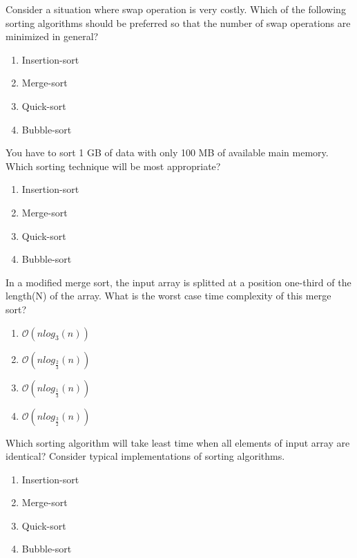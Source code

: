 \begin{problem}
Consider a situation where swap operation is very costly. Which of the following sorting algorithms should be preferred so that the number of swap operations are minimized in general?
\begin{enumerate}
\item Insertion-sort
\item Merge-sort
\item Quick-sort
\item Bubble-sort
\end{enumerate}

\end{problem}



\begin{problem}
You have to sort 1 GB of data with only 100 MB of available main memory. Which sorting technique will be most appropriate?
\begin{enumerate}
\item Insertion-sort
\item Merge-sort
\item Quick-sort
\item Bubble-sort
\end{enumerate}

\end{problem}


\begin{problem}
In a modified merge sort, the input array is splitted at a position one-third of the length(N) of the array. What is the worst case time complexity of this merge sort?
\begin{enumerate}
\item $\mathcal{O}(nlog_3(n))$
\item $\mathcal{O}(nlog_{\frac{2}{3}}(n))$
\item $\mathcal{O}(nlog_{\frac{1}{3}}(n))$
\item $\mathcal{O}(nlog_{\frac{3}{2}}(n))$

\end{enumerate}

\end{problem}


\begin{problem}
Which sorting algorithm will take least time when all elements of input array are identical? Consider typical implementations of sorting algorithms.
\begin{enumerate}
\item Insertion-sort
\item Merge-sort
\item Quick-sort
\item Bubble-sort
\end{enumerate}

\end{problem}


